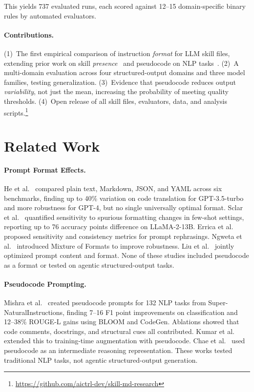 \documentclass[sigconf,nonacm]{acmart}
\begin{document}
\noindent
This yields 737 evaluated runs, each scored against 12--15 domain-specific
binary rules by automated evaluators.

\paragraph{Contributions.}
(1)~The first empirical comparison of instruction \emph{format} for LLM skill
files, extending prior work on skill \emph{presence}~\cite{li2026skillsbench}
and pseudocode on NLP tasks~\cite{mishra2023prompting}.
(2)~A multi-domain evaluation across four structured-output domains and three
model families, testing generalization.
(3)~Evidence that pseudocode reduces output \emph{variability}, not just the
mean, increasing the probability of meeting quality thresholds.
(4)~Open release of all skill files, evaluators, data, and analysis
scripts.\footnote{\url{https://github.com/aictrl-dev/skill-md-research}}



\section{Related Work}\label{sec:related}

\paragraph{Prompt Format Effects.}
He et al.~\cite{he2024prompt} compared plain text, Markdown, JSON, and YAML
across six benchmarks, finding up to 40\% variation on code translation for
GPT-3.5-turbo and more robustness for GPT-4, but no single universally optimal
format. Sclar et al.~\cite{sclar2024quantifying} quantified sensitivity to
spurious formatting changes in few-shot settings, reporting up to 76 accuracy
points difference on LLaMA-2-13B. Errica et al.~\cite{errica2025sensitivity}
proposed sensitivity and consistency metrics for prompt rephrasings. Ngweta et
al.~\cite{ngweta2025mof} introduced Mixture of Formats to improve robustness.
Liu et al.~\cite{liu2025cfpo} jointly optimized prompt content and format.
None of these studies included pseudocode as a format or tested on agentic
structured-output tasks.

\paragraph{Pseudocode Prompting.}
Mishra et al.~\cite{mishra2023prompting} created pseudocode prompts for 132
NLP tasks from Super-NaturalInstructions, finding 7--16 F1 point improvements
on classification and 12--38\% ROUGE-L gains using BLOOM and CodeGen.
Ablations showed that code comments, docstrings, and structural cues all
contributed. Kumar et al.~\cite{kumar2025training} extended this to
training-time augmentation with pseudocode. Chae et
al.~\cite{chae2024compilers} used pseudocode as an intermediate reasoning
representation. These works tested traditional NLP tasks, not agentic
structured-output generation.
\end{document}

